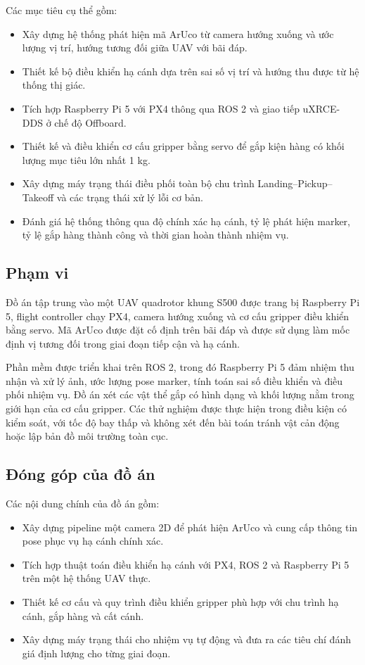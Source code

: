 Các mục tiêu cụ thể gồm:
\begin{itemize}
  \item Xây dựng hệ thống phát hiện mã ArUco từ camera hướng xuống và ước lượng vị trí, hướng tương đối giữa UAV với bãi đáp.
  \item Thiết kế bộ điều khiển hạ cánh dựa trên sai số vị trí và hướng thu được từ hệ thống thị giác.
  \item Tích hợp Raspberry Pi 5 với PX4 thông qua ROS 2 và giao tiếp uXRCE-DDS ở chế độ Offboard.
  \item Thiết kế và điều khiển cơ cấu gripper bằng servo để gắp kiện hàng có khối lượng mục tiêu lớn nhất 1 kg.
  \item Xây dựng máy trạng thái điều phối toàn bộ chu trình Landing--Pickup--Takeoff và các trạng thái xử lý lỗi cơ bản.
  \item Đánh giá hệ thống thông qua độ chính xác hạ cánh, tỷ lệ phát hiện marker, tỷ lệ gắp hàng thành công và thời gian hoàn thành nhiệm vụ.
\end{itemize}

\subsection{Phạm vi}

Đồ án tập trung vào một UAV quadrotor khung S500 được trang bị Raspberry Pi 5, flight controller chạy PX4, camera hướng xuống và cơ cấu gripper điều khiển bằng servo. Mã ArUco được đặt cố định trên bãi đáp và được sử dụng làm mốc định vị tương đối trong giai đoạn tiếp cận và hạ cánh.

Phần mềm được triển khai trên ROS 2, trong đó Raspberry Pi 5 đảm nhiệm thu nhận và xử lý ảnh, ước lượng pose marker, tính toán sai số điều khiển và điều phối nhiệm vụ. Đồ án xét các vật thể gắp có hình dạng và khối lượng nằm trong giới hạn của cơ cấu gripper. Các thử nghiệm được thực hiện trong điều kiện có kiểm soát, với tốc độ bay thấp và không xét đến bài toán tránh vật cản động hoặc lập bản đồ môi trường toàn cục.

\subsection{Đóng góp của đồ án}

Các nội dung chính của đồ án gồm:
\begin{itemize}
  \item Xây dựng pipeline một camera 2D để phát hiện ArUco và cung cấp thông tin pose phục vụ hạ cánh chính xác.
  \item Tích hợp thuật toán điều khiển hạ cánh với PX4, ROS 2 và Raspberry Pi 5 trên một hệ thống UAV thực.
  \item Thiết kế cơ cấu và quy trình điều khiển gripper phù hợp với chu trình hạ cánh, gắp hàng và cất cánh.
  \item Xây dựng máy trạng thái cho nhiệm vụ tự động và đưa ra các tiêu chí đánh giá định lượng cho từng giai đoạn.
\end{itemize}

